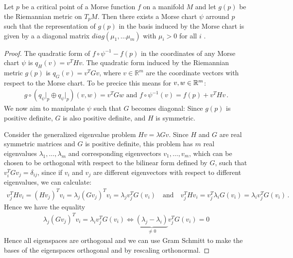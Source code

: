 \begin{theorem}\label{thm: Simultaneous Diagonalisation of Quadratic Forms}
	Let $p$ be a critical point of a Morse function $f$ on a manifold $M$ and let $g(p)$ be the Riemannian metric on $T_pM$. Then there exists a Morse chart $\psi$ arround $p$ such that the representation of $g(p)$ in the basis induced by the Morse chart is given by a a diagonal matrix $diag(\mu_1,\dots \mu_m)$ with $\mu_i>0$ for all $i$ .
\end{theorem}
\begin{proof}
	The quadratic form of $f \circ \psi^{-1} - f(p)$ in the coordinates of any Morse chart $\psi$ is $q_H(v) = v^T H v$. The quadratic form induced by the Riemannian metric $g(p)$ is $q_G(v) = v^T G v$, where $v \in \mathbb{R}^m$ are the coordinate vectors with respect to the Morse chart. 
	To be precice this means for $v,w\in \mathbb{R}^m$:
	\begin{align*}
		g\circ ( q_{\psi}\big|_p\oplus q_{\psi}\big|_p ) (v,w)=v^TG w \text{ and } f\circ \psi^{-1} (v)=f(p)+v^T H v \, .
	\end{align*} We now aim to manipulate $\psi$ such that $G$ becomes diagonal:
	Since $g(p)$ is positive definite, $G$ is also positive definite, and $H$ is symmetric.
	
	Consider the generalized eigenvalue problem $Hv = \lambda G v$. Since $H$ and $G$ are real symmetric matrices and $G$ is positive definite, this problem has $m$ real eigenvalues $\lambda_1, \dots, \lambda_m$ and corresponding eigenvectors $v_1, \dots, v_m$, which can be chosen to be orthogonal with respect to the bilinear form defined by $G$, such that $v_i^T G v_j = \delta_{ij}$, since if $v_i$ and $v_j$ are different eigenvectors with respect to different eigenvalues, we can calculate:
	 \begin{align*}
	 	v_j^THv_i=(Hv_j)^Tv_i=\lambda _j(Gv_j)^Tv_i=\lambda _j v_j^T G(v_i)  \quad \text{and}\quad 	v_j^THv_i= v_j^T \lambda_i G(v_i)=\lambda_i v_j^TG(v_i) \, .
	 \end{align*} Hence we have the equality
	 \begin{align*}
	 	\lambda _j(Gv_j)^Tv_i=\lambda_i v_j^TG(v_i) \Leftrightarrow \underbrace{(\lambda_j-\lambda_i)}_{\neq 0}v_j^T G(v_i)=0
	 \end{align*} Hence all eigenspaces are orthogonal and we can use Gram Schmitt to make the bases of the eigenspaces orthogonal and by rescaling orthonormal.
	

\end{proof}
